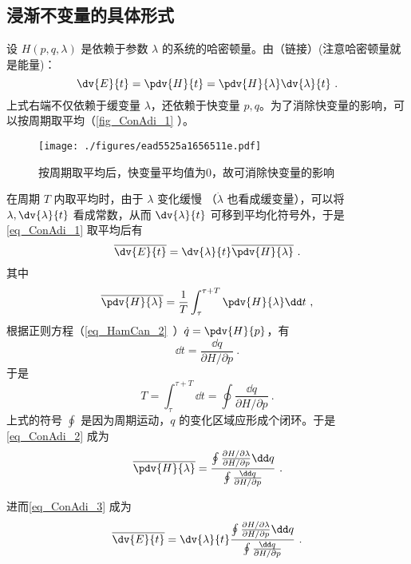 \subsection{浸渐不变量的具体形式}
设 $H(p,q,\lambda)$ 是依赖于参数 $\lambda$ 的系统的哈密顿量。由（链接）(注意哈密顿量就是能量)：
\begin{equation}\label{eq_ConAdi_1}
\dv{E}{t}=\pdv{H}{t}=\pdv{H}{\lambda}\dv{\lambda}{t}~.
\end{equation}
上式右端不仅依赖于缓变量 $\lambda$，还依赖于快变量 $p,q$。为了消除快变量的影响，可以按周期取平均（\autoref{fig_ConAdi_1} ）。
\begin{figure}[ht]
\centering
\texttt{[image: ./figures/ead5525a1656511e.pdf]}
\caption{按周期取平均后，快变量平均值为0，故可消除快变量的影响} \label{fig_ConAdi_1}
\end{figure}
在周期 $T$ 内取平均时，由于 $\lambda$ 变化缓慢 （$\dot\lambda$ 也看成缓变量），可以将 $\lambda,\dv{\lambda}{t}$ 看成常数，从而 $\dv{\lambda}{t}$ 可移到平均化符号外，于是\autoref{eq_ConAdi_1} 取平均后有
\begin{equation}\label{eq_ConAdi_3}
\overline{\dv{E}{t}}=\dv{\lambda}{t}\overline{\pdv{H}{\lambda}}~.
\end{equation}
其中
\begin{equation}\label{eq_ConAdi_2}
\overline{\pdv{H}{\lambda}}=\frac{1}{T}\int_\tau^{\tau+T}\pdv{H}{\lambda}\dd t~,
\end{equation}
根据正则方程（\autoref{eq_HamCan_2}~）$\dot q=\pdv{H}{p}$，有
\begin{equation}
\dd t=\frac{\dd q}{\partial{H}/\partial{p}}~.
\end{equation}
于是
\begin{equation}
T=\int_{\tau}^{\tau+T}\dd t=\oint\frac{\dd q}{\partial{H}/\partial{p}}~.
\end{equation}
上式的符号 $\oint$ 是因为周期运动，$q$ 的变化区域应形成个闭环。于是\autoref{eq_ConAdi_2} 成为
\begin{equation}
\overline{\pdv{H}{\lambda}}=\frac{\oint\frac{\partial{H}/\partial{\lambda}}{\partial{H}/\partial{p}}\dd q}
{\oint\frac{\dd q}{\partial{H}/\partial{p}}}~.
\end{equation}
 
进而\autoref{eq_ConAdi_3} 成为
\begin{equation}\label{eq_ConAdi_5}
\overline{\dv{E}{t}}=\dv{\lambda}{t}
\frac{\oint\frac{\partial{H}/\partial{\lambda}}{\partial{H}/\partial{p}}\dd q}
{\oint\frac{\dd q}{\partial{H}/\partial{p}}}~.
\end{equation}

